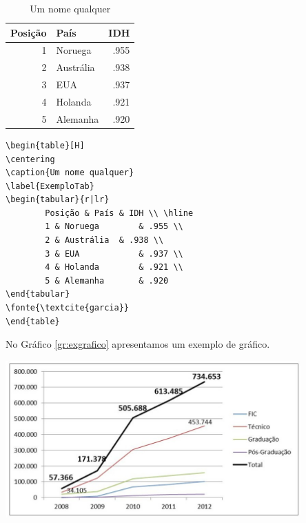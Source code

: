 \begin{table}[H]
\centering
\caption{Um nome qualquer}
\label{ExemploTab}
\begin{tabular}{r|lr}	
Posição & País & IDH \\ \hline
	1 & Noruega        & .955 \\
	2 & Austrália  & .938 \\
	3 & EUA            & .937 \\
	4 & Holanda        & .921 \\
	5 & Alemanha       & .920            %
\end{tabular}
\end{table}

\begin{verbatim}
\begin{table}[H]
\centering
\caption{Um nome qualquer}
\label{ExemploTab}
\begin{tabular}{r|lr}	
    	Posição & País & IDH \\	\hline
    	1 & Noruega        & .955 \\
    	2 & Austrália  & .938 \\
    	3 & EUA            & .937 \\
    	4 & Holanda        & .921 \\
    	5 & Alemanha       & .920 
\end{tabular}
\fonte{\textcite{garcia}}
\end{table}
\end{verbatim}


\pagebreak

No Gráfico \ref{gr:exgrafico} apresentamos um exemplo de gráfico.

\begin{grafico}[H]
\centering
\caption{Evolução de matrículas dos Institutos Federais}
\includegraphics[height=6cm]{./figuras/redefederal.jpg}	
\label{gr:exgrafico}
\end{grafico}

